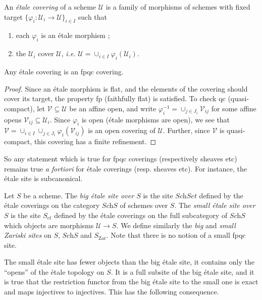 \begin{definition}
An {\it \'etale covering} of a scheme $\mathcal{U}$ is a family of morphisms 
of schemes with fixed target $\{ \varphi_i : \mathcal{U}_i \to \mathcal{U} 
\}_{i \in I}$ such that 
\begin{enumerate}
\item each $\varphi_i$ is an \'etale morphism ;
\item the $\mathcal{U}_i$ cover $\mathcal{U}$, {\it i.e.} $\mathcal{U} = 
\cup_{i\in I}\varphi_i(\mathcal{U}_i)$.
\end{enumerate}
\end{definition}

\begin{lemma}
Any \'etale covering is an fpqc covering. 
\end{lemma}

\begin{proof}
Since an \'etale morphism is flat, and the elements of the covering should 
cover its target, the property fp (faithfully flat) is satisfied. To check qc 
(quasi-compact), let $\mathcal{V} \subseteq \mathcal{U}$ be an affine open, and 
write $\varphi_i^{-1} = \cup_{j \in J_i} \mathcal{V}_{ij}$ for some affine 
opens $\mathcal{V}_{ij} \subseteq \mathcal{U}_i$. Since $\varphi_i$ is open 
(\'etale morphisms are open), we see that $\mathcal{V} = \cup_{i\in I}\cup_{j 
\in J_i} \varphi_i(\mathcal{V}_{ij})$ is an open covering of $\mathcal{U}$. 
Further, since $\mathcal{V}$ is quasi-compact, this covering has a finite 
refinement.
\end{proof}

\noindent
So any statement which is true for fpqc coverings (respectively sheaves etc) 
remains true {\it a fortiori} for \'etale coverings (resp. sheaves etc). For 
instance, the \'etale site is subcanonical.

\begin{definition}
Let $S$ be a scheme. The {\it big \'etale site over $S$} is the site 
$\textit{Sch}Set$ defined by the \'etale coverings on the category 
$\textit{Sch}S$ of schemes over $S$. The {\it small \'etale site over $S$} is 
the site $S_{et}$ defined by the \'etale coverings on the full subcategory of 
$\textit{Sch}S$ which objects are morphisms $\mathcal{U} \to S$. We define 
similarly the {\it big} and {\it small Zariski sites} on $S$, $\textit{Sch}S$ 
and $S_\mathrm{Zar}$. Note that there is no notion of a small fpqc site.
\end{definition}

\noindent
The small \'etale site has fewer objects than the big \'etale site, it contains 
only the ``opens'' of the \'etale topology on $S$. It is a full subsite of the 
big \'etale site, and it is true that the restriction functor from the big 
\'etale site to the small one is exact and maps injectives to injectives. This 
has the following consequence.

